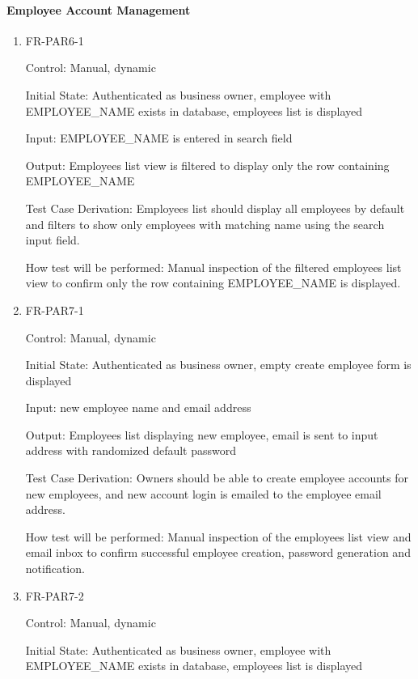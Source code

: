 \documentclass[12pt, titlepage]{article}
\begin{document}
\paragraph{Employee Account Management}

\begin{enumerate}

\item{FR-PAR6-1\\}

Control: Manual, dynamic
					
Initial State: Authenticated as business owner, employee with EMPLOYEE\_NAME exists in database, employees list is displayed
					
Input: EMPLOYEE\_NAME is entered in search field

Output: Employees list view is filtered to display only the row containing EMPLOYEE\_NAME

Test Case Derivation: Employees list should display all employees by default and filters to show only employees with matching name using the search input field.
					
How test will be performed: Manual inspection of the filtered employees list view to confirm only the row containing EMPLOYEE\_NAME is displayed.

\item{FR-PAR7-1\\}

Control: Manual, dynamic
					
Initial State: Authenticated as business owner, empty create employee form is displayed
					
Input: new employee name and email address

Output: Employees list displaying new employee, email is sent to input address with randomized default password

Test Case Derivation: Owners should be able to create employee accounts for new employees, and new account login is emailed to the employee email address.
					
How test will be performed: Manual inspection of the employees list view and email inbox to confirm successful employee creation, password generation and notification.

\item{FR-PAR7-2\\}

Control: Manual, dynamic
					
Initial State: Authenticated as business owner, employee with EMPLOYEE\_NAME exists in database, employees list is displayed
					

\end{enumerate}
\end{document}

